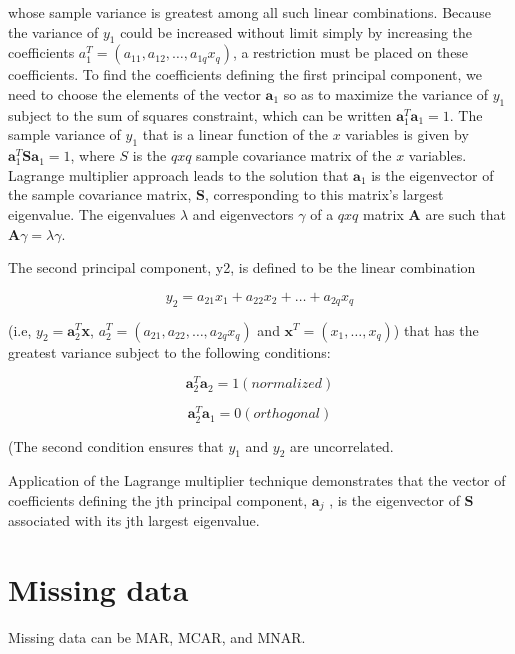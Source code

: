 whose sample variance is greatest among all such linear combinations. Because the variance of $y_1$ could be increased without limit simply by increasing the coefficients $a_1^T = (a_{11}, a_{12}, \dots, a_{1q}x_q)$, a restriction must be placed on these coefficients. To find the coefficients defining the first principal component, we need to choose the elements of the vector  $\textbf{a}_1$
so as to maximize the variance of $y_1$ subject to the sum of squares constraint, which can be written $\textbf{a}_1^T\textbf{a}_1 = 1$. The sample variance of $y_1$ that is a linear function of the $x$ variables is given by $\textbf{a}_1^T\textbf{S}\textbf{a}_1 = 1$, where $S$ is the $q x q$ sample covariance matrix of the $x$ variables. Lagrange multiplier approach leads to the solution that $\textbf{a}_1$ is the eigenvector of the sample covariance matrix, $\textbf{S}$, corresponding to this matrix's largest eigenvalue. The eigenvalues $\lambda$ and eigenvectors $\gamma$ of a $q x q$ matrix $\textbf{A}$ are such that $\textbf{A}\gamma = \lambda\gamma$.

The second principal component, y2, is defined to be the linear combination

\begin{equation}
    y_2 = a_{21}x_1 + a_{22}x_2 + \dots + a_{2q}x_q
\end{equation}

(i.e, $y_2 = \textbf{a}_2^T$\textbf{x}, $a_2^T = (a_{21}, a_{22}, \dots, a_{2q}x_q)$ and $\textbf{x}^T = (x_1, \dots, x_q)$) that has the greatest variance subject to the following conditions:

\begin{equation}
    \textbf{a}_2^T\textbf{a}_2 = 1 (normalized)
\end{equation}

\begin{equation}
    \textbf{a}_2^T\textbf{a}_1 = 0 (orthogonal)
\end{equation}

(The second condition ensures that $y_1$ and $y_2$ are uncorrelated.

Application of the Lagrange multiplier technique demonstrates that the vector
of coefficients defining the jth principal component, $\textbf{a}_j$ , is the eigenvector of $\textbf{S}$ associated with its jth largest eigenvalue.


\section{Missing data}
Missing data can be MAR, MCAR, and MNAR.

